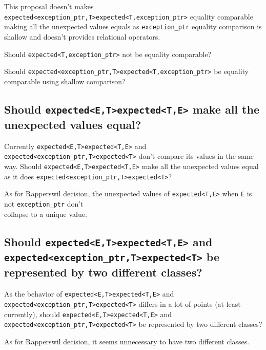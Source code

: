 \documentclass[a4paper,10pt]{article}
\newcommand{\cpp}[1]{\lstinline{#1}}
\newcommand{\suppress}[1]{\colorbox{suppress_color}{#1}}
\newcommand{\update}[1]{\colorbox{update_color}{#1}}
\begin{document}
This proposal \suppress{doesn't} make\update{s} \suppress{\cpp{expected<exception_ptr,T>}}\update{\cpp{expected<T,exception_ptr>}} \update{equality} comparable \update{making all the unexpected values equals} as \cpp{exception_ptr} equality comparison is shallow and doesn't provides relational operators.

\update{Should \cpp{expected<T,exception_ptr>} not be equality comparable?}

Should \suppress{\cpp{expected<exception_ptr,T>}}\update{\cpp{expected<T,exception_ptr>}} be equality comparable using shallow comparison?

\subsection{Should \suppress{\cpp{expected<E,T>}}\update{\cpp{expected<T,E>}} make all the unexpected values equal?}

Currently \suppress{\cpp{expected<E,T>}}\update{\cpp{expected<T,E>}} and \suppress{\cpp{expected<exception_ptr,T>}}\update{\cpp{expected<T>}} don't compare its values in the same way.
Should \suppress{\cpp{expected<E,T>}}\update{\cpp{expected<T,E>}} make all the unexpected values equal as it does \suppress{\cpp{expected<exception_ptr,T>}}\update{\cpp{expected<T>}}?

\update{As for Rapperswil decision, the unexpected values of \cpp{expected<T,E>} when \cpp{E} is not \cpp{exception_ptr} don't} \\
\update{collapse to a unique value.} 

\subsection{Should \suppress{\cpp{expected<E,T>}}\update{\cpp{expected<T,E>}} and \suppress{\cpp{expected<exception_ptr,T>}}\update{\cpp{expected<T>}} be represented by two different classes?}

As the behavior of \suppress{\cpp{expected<E,T>}}\update{\cpp{expected<T,E>}} and \suppress{\cpp{expected<exception_ptr,T>}}\update{\cpp{expected<T>}} differs in a lot of points (at least currently), should \suppress{\cpp{expected<E,T>}}\update{\cpp{expected<T,E>}} and \suppress{\cpp{expected<exception_ptr,T>}}\update{\cpp{expected<T>}} be represented by two different classes?

\update{As for Rapperswil decision, it seems unnecessary to have two different classes.}
\end{document}
